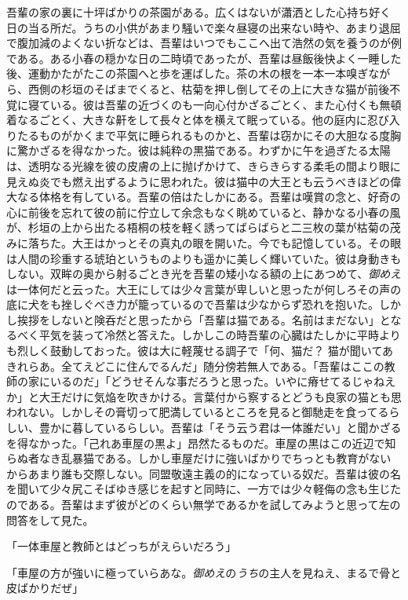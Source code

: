 \documentclass[12pt, openright]{book}
\begin{document}
吾輩の家の裏に十坪ばかりの茶園がある。広くはないが瀟洒とした心持ち好く日の当る所だ。うちの小供があまり騒いで楽々昼寝の出来ない時や、あまり退屈で腹加減のよくない折などは、吾輩はいつでもここへ出て浩然の気を養うのが例である。ある小春の穏かな日の二時頃であったが、吾輩は昼飯後快よく一睡した後、運動かたがたこの茶園へと歩を運ばした。茶の木の根を一本一本嗅ぎながら、西側の杉垣のそばまでくると、枯菊を押し倒してその上に大きな猫が前後不覚に寝ている。彼は吾輩の近づくのも一向心付かざるごとく、また心付くも無頓着なるごとく、大きな鼾をして長々と体を横えて眠っている。他の庭内に忍び入りたるものがかくまで平気に睡られるものかと、吾輩は窃かにその大胆なる度胸に驚かざるを得なかった。彼は純粋の黒猫である。わずかに午を過ぎたる太陽は、透明なる光線を彼の皮膚の上に抛げかけて、きらきらする柔毛の間より眼に見えぬ炎でも燃え出ずるように思われた。彼は猫中の大王とも云うべきほどの偉大なる体格を有している。吾輩の倍はたしかにある。吾輩は嘆賞の念と、好奇の心に前後を忘れて彼の前に佇立して余念もなく眺めていると、静かなる小春の風が、杉垣の上から出たる梧桐の枝を軽く誘ってばらばらと二三枚の葉が枯菊の茂みに落ちた。大王はかっとその真丸の眼を開いた。今でも記憶している。その眼は人間の珍重する琥珀というものよりも遥かに美しく輝いていた。彼は身動きもしない。双眸の奥から射るごとき光を吾輩の矮小なる額の上にあつめて、\emph{御めえ}は一体何だと云った。大王にしては少々言葉が卑しいと思ったが何しろその声の底に犬をも挫しぐべき力が籠っているので吾輩は少なからず恐れを抱いた。しかし挨拶をしないと険呑だと思ったから「吾輩は猫である。名前はまだない」となるべく平気を装って冷然と答えた。しかしこの時吾輩の心臓はたしかに平時よりも烈しく鼓動しておった。彼は大に軽蔑せる調子で「何、猫だ？ 猫が聞いてあきれらあ。全てえどこに住んでるんだ」随分傍若無人である。「吾輩はここの教師の家にいるのだ」「どうせそんな事だろうと思った。いやに瘠せてるじゃねえか」と大王だけに気焔を吹きかける。言葉付から察するとどうも良家の猫とも思われない。しかしその膏切って肥満しているところを見ると御馳走を食ってるらしい、豊かに暮しているらしい。吾輩は「そう云う君は一体誰だい」と聞かざるを得なかった。「己れあ車屋の黒よ」昂然たるものだ。車屋の黒はこの近辺で知らぬ者なき乱暴猫である。しかし車屋だけに強いばかりでちっとも教育がないからあまり誰も交際しない。同盟敬遠主義の的になっている奴だ。吾輩は彼の名を聞いて少々尻こそばゆき感じを起すと同時に、一方では少々軽侮の念も生じたのである。吾輩はまず彼がどのくらい無学であるかを試してみようと思って左の問答をして見た。

「一体車屋と教師とはどっちがえらいだろう」

「車屋の方が強いに極っていらあな。\emph{御めえ}の\emph{うち}の主人を見ねえ、まるで骨と皮ばかりだぜ」
\end{document}
